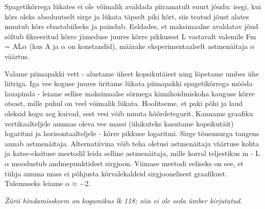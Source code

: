 
Spagetikõrrega lükates ei ole võimalik avaldada piiramatult suurt jõudu: isegi, kui kõrs oleks absoluutselt sirge ja lükata täpselt piki kõrt, siis teatud jõust alates muutub kõrs ebastabiilseks ja paindub. Eeldades, et maksimaalne avaldatav jõud sõltub fikseeritud kõrre jämeduse juures kõrre pikkusest L vastavalt valemile Fm = AL$\alpha$ (kus A ja $\alpha$ on konstandid), määrake eksperimentaalselt astmenäitaja $\alpha$ väärtus.

\hint

\solu
Valame piimapakki vett - alustame ühest kopsikutäiest ning lõpetame umbes ühe liitriga. Iga vee koguse juures üritame lükata piimapakki spagetikõrrega mööda lauapinda - leiame sellise maksimaalse sõrmega kinnihoidmiskoha kauguse kõrre otsast, mille puhul on veel võimalik lükata. Hoolitseme, et paki põhi ja laud oleksid kogu aeg kuivad, sest vesi võib muuta hõõrdetegurit. Kanname graafiku vertikaalteljele anumas oleva vee massi (ühikuteks kasutame kopsikutäit) logaritmi ja horisontaalteljele - kõrre pikkuse logaritmi. Sirge tõusunurga tangens annab astmenäitaja. Alternatiivina võib teha oletusi astmenäitaja väärtuse kohta ja katse-eksituse meetodil leida selline astmenäitaja, mille korral teljestikus m - L$\alpha$ moodustub andmepunktidest sirgjoon. Viimase meetodi eeliseks on see, et tühja anuma mass ei põhjusta kõrvalekaldeid sirgjoonelisest graafikust. Tulemuseks leiame $\alpha \approx -$2.

\textit{Žürii hindamisskeem on kogumikus lk 118; siia ei ole seda ümber kirjutatud.}
\probend
